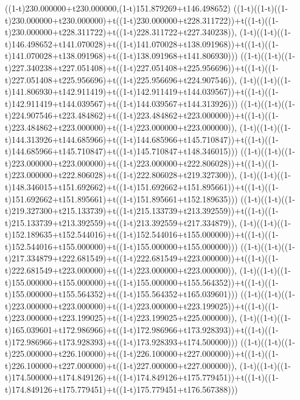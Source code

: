 ((1-t)230.000000+t230.000000,(1-t)151.879269+t146.498652)
((1-t)((1-t)((1-t)230.000000+t230.000000)+t((1-t)230.000000+t228.311722))+t((1-t)((1-t)230.000000+t228.311722)+t((1-t)228.311722+t227.340238)),                                     (1-t)((1-t)((1-t)146.498652+t141.070028)+t((1-t)141.070028+t138.091968))+t((1-t)((1-t)141.070028+t138.091968)+t((1-t)138.091968+t141.806930)))
((1-t)((1-t)((1-t)227.340238+t227.051408)+t((1-t)227.051408+t225.956696))+t((1-t)((1-t)227.051408+t225.956696)+t((1-t)225.956696+t224.907546)),                                     (1-t)((1-t)((1-t)141.806930+t142.911419)+t((1-t)142.911419+t144.039567))+t((1-t)((1-t)142.911419+t144.039567)+t((1-t)144.039567+t144.313926)))
((1-t)((1-t)((1-t)224.907546+t223.484862)+t((1-t)223.484862+t223.000000))+t((1-t)((1-t)223.484862+t223.000000)+t((1-t)223.000000+t223.000000)),                                     (1-t)((1-t)((1-t)144.313926+t144.685966)+t((1-t)144.685966+t145.710847))+t((1-t)((1-t)144.685966+t145.710847)+t((1-t)145.710847+t148.346015)))
((1-t)((1-t)((1-t)223.000000+t223.000000)+t((1-t)223.000000+t222.806028))+t((1-t)((1-t)223.000000+t222.806028)+t((1-t)222.806028+t219.327300)),                                     (1-t)((1-t)((1-t)148.346015+t151.692662)+t((1-t)151.692662+t151.895661))+t((1-t)((1-t)151.692662+t151.895661)+t((1-t)151.895661+t152.189635)))
((1-t)((1-t)((1-t)219.327300+t215.133739)+t((1-t)215.133739+t213.392559))+t((1-t)((1-t)215.133739+t213.392559)+t((1-t)213.392559+t217.334879)),                                     (1-t)((1-t)((1-t)152.189635+t152.544016)+t((1-t)152.544016+t155.000000))+t((1-t)((1-t)152.544016+t155.000000)+t((1-t)155.000000+t155.000000)))
((1-t)((1-t)((1-t)217.334879+t222.681549)+t((1-t)222.681549+t223.000000))+t((1-t)((1-t)222.681549+t223.000000)+t((1-t)223.000000+t223.000000)),                                     (1-t)((1-t)((1-t)155.000000+t155.000000)+t((1-t)155.000000+t155.564352))+t((1-t)((1-t)155.000000+t155.564352)+t((1-t)155.564352+t165.039601)))
((1-t)((1-t)((1-t)223.000000+t223.000000)+t((1-t)223.000000+t223.199025))+t((1-t)((1-t)223.000000+t223.199025)+t((1-t)223.199025+t225.000000)),                                     (1-t)((1-t)((1-t)165.039601+t172.986966)+t((1-t)172.986966+t173.928393))+t((1-t)((1-t)172.986966+t173.928393)+t((1-t)173.928393+t174.500000)))
((1-t)((1-t)((1-t)225.000000+t226.100000)+t((1-t)226.100000+t227.000000))+t((1-t)((1-t)226.100000+t227.000000)+t((1-t)227.000000+t227.000000)),                                     (1-t)((1-t)((1-t)174.500000+t174.849126)+t((1-t)174.849126+t175.779451))+t((1-t)((1-t)174.849126+t175.779451)+t((1-t)175.779451+t176.567388)))

